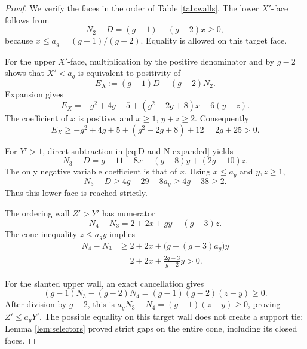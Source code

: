 \documentclass[11pt]{article}
\theoremstyle{remark}
\numberwithin{equation}{section}
\begin{document}
\begin{proof}
We verify the faces in the order of Table \ref{tab:walls}.  The lower
\(X'\)-face follows from
\[
N_2-D=(g-1)-(g-2)x\geq0,
\]
because \(x\leq a_g=(g-1)/(g-2)\).  Equality is allowed on this target
face.

For the upper \(X'\)-face, multiplication by the positive denominator and
by \(g-2\) shows that \(X'<a_g\) is equivalent to positivity of
\[
E_X:=(g-1)D-(g-2)N_2.
\]
Expansion gives
\begin{equation}\label{eq:EX}
E_X=-g^2+4g+5+(g^2-2g+8)x+6(y+z).
\end{equation}
The coefficient of \(x\) is positive, and \(x\geq1\), \(y+z\geq2\).
Consequently
\[
E_X\geq-g^2+4g+5+(g^2-2g+8)+12=2g+25>0.
\]

For \(Y'>1\), direct subtraction in \eqref{eq:D-and-N-expanded} yields
\begin{equation}\label{eq:Y-lower}
N_3-D=g-11-8x+(g-8)y+(2g-10)z.
\end{equation}
The only negative variable coefficient is that of \(x\).  Using
\(x\leq a_g\) and \(y,z\geq1\),
\[
N_3-D\geq4g-29-8a_g\geq4g-38\geq2.
\]
Thus this lower face is reached strictly.

The ordering wall \(Z'>Y'\) has numerator
\begin{equation}\label{eq:Z-Y}
N_4-N_3=2+2x+gy-(g-3)z.
\end{equation}
The cone inequality \(z\leq a_gy\) implies
\begin{equation}\label{eq:Z-Y-bound}
\begin{aligned}
N_4-N_3
&\geq2+2x+\bigl(g-(g-3)a_g\bigr)y\\
&=2+2x+\frac{2g-3}{g-2}y>0.
\end{aligned}
\end{equation}

For the slanted upper wall, an exact cancellation gives
\begin{equation}\label{eq:slanted-wall}
(g-1)N_3-(g-2)N_4
=(g-1)(g-2)(z-y)\geq0.
\end{equation}
After division by \(g-2\), this is
\(a_gN_3-N_4=(g-1)(z-y)\geq0\), proving
\(Z'\leq a_gY'\).  The possible equality on this target wall does not
create a support tie: Lemma \ref{lem:selectors} proved strict gaps on the
entire cone, including its closed faces.


\end{proof}
\end{document}
